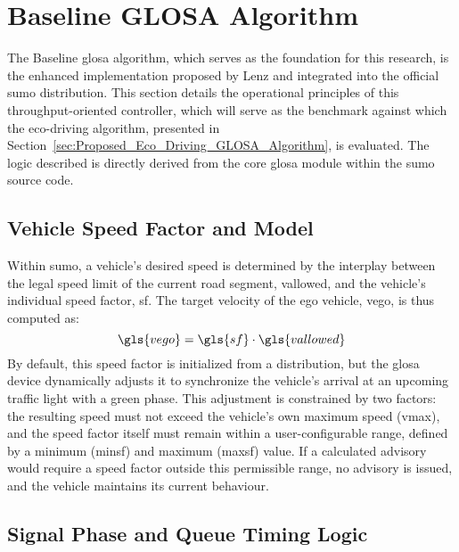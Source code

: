 \section{Baseline GLOSA Algorithm}
\label{sec:Baseline_Glosa_Algorithm}

The Baseline \ac{glosa} algorithm, which serves as the foundation for this research, is the enhanced implementation proposed by Lenz \cite{Lenz2024} and integrated into the official \ac{sumo} distribution. This section details the operational principles of this throughput-oriented controller, which will serve as the benchmark against which the eco-driving algorithm, presented in Section~\vref{sec:Proposed_Eco_Driving_GLOSA_Algorithm}, is evaluated. The logic described is directly derived from the core \ac{glosa} module within the \ac{sumo} source code.

\subsection{Vehicle Speed Factor and Model}
\label{sec:Glosa_Speed_Factor_Model}

Within \ac{sumo}, a vehicle's desired speed is determined by the interplay between the legal speed limit of the current road segment, \gls{vallowed}, and the vehicle's individual speed factor, \gls{sf}. The target velocity of the ego vehicle, \gls{vego}, is thus computed as:
\begin{equation}
    \gls{vego} = \gls{sf} \cdot \gls{vallowed}
\end{equation}
By default, this speed factor is initialized from a distribution, but the \ac{glosa} device dynamically adjusts it to synchronize the vehicle's arrival at an upcoming traffic light with a green phase. This adjustment is constrained by two factors: the resulting speed must not exceed the vehicle's own maximum speed (\gls{vmax}), and the speed factor itself must remain within a user-configurable range, defined by a minimum (\gls{minsf}) and maximum (\gls{maxsf}) value. If a calculated advisory would require a speed factor outside this permissible range, no advisory is issued, and the vehicle maintains its current behaviour.

\subsection{Signal Phase and Queue Timing Logic}
\label{sec:Glosa_Signal_Phase_Timing}

